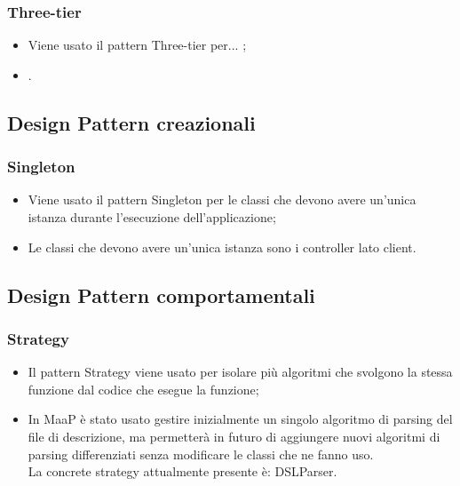 \subsubsection{Three-tier}
\begin{itemize}
\item {} Viene usato il pattern Three-tier per... ; 
\item {} .
\end{itemize}

\subsection{Design Pattern creazionali}
\subsubsection{Singleton}
\begin{itemize}
\item {} Viene usato il pattern Singleton per le classi che devono avere un'unica istanza durante l'esecuzione dell'applicazione; 
\item {} Le classi che devono avere un'unica istanza sono i controller lato client.
\end{itemize}

\subsection{Design Pattern comportamentali} 
\subsubsection{Strategy}
\begin{itemize}
\item {} Il pattern Strategy viene usato per isolare più algoritmi che svolgono la stessa funzione dal codice che esegue la funzione; 
\item {} In MaaP è stato usato gestire inizialmente un singolo algoritmo di parsing del file di descrizione, ma permetterà in futuro di aggiungere nuovi algoritmi di parsing differenziati senza modificare le classi che ne fanno uso.\\
La concrete strategy attualmente presente è: DSLParser.
\end{itemize}

